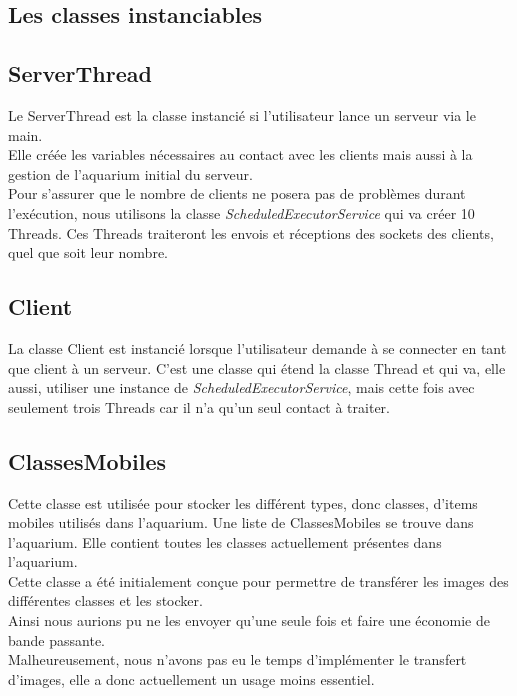 \documentclass[a4paper, 12pt]{report}
\begin{document}
\begin{spacing}{1.3}
	\textcolor{colortitre2}{\subsection*{Les classes instanciables}}  	

		\textcolor{colortitre3}{\subsection*{ServerThread}}    

	Le ServerThread est la classe instancié si l'utilisateur lance un serveur via le main. \\
	Elle créée les variables nécessaires au contact avec les clients mais aussi à la gestion de l'aquarium initial du serveur. \\
	Pour s'assurer que le nombre de clients ne posera pas de problèmes durant l'exécution, nous utilisons la classe \textit{ScheduledExecutorService} qui va créer 10 Threads. Ces Threads traiteront les envois et réceptions des sockets des clients, quel que soit leur nombre. \\
	
		\textcolor{colortitre3}{\subsection*{Client}}    
	La classe Client est instancié lorsque l'utilisateur demande à se connecter en tant que client à un serveur. C'est une classe qui étend la classe Thread et qui va, elle aussi, utiliser une instance de \textit{ScheduledExecutorService}, mais cette fois avec seulement trois Threads car il n'a qu'un seul contact à traiter.
		
		\textcolor{colortitre3}{\subsection*{ClassesMobiles}}    
		
	Cette classe est utilisée pour stocker les différent types, donc classes, d'items mobiles utilisés dans l'aquarium. Une liste de ClassesMobiles se trouve dans l'aquarium. Elle contient toutes les classes actuellement présentes dans l'aquarium. \\ Cette classe a été initialement conçue pour permettre de transférer les images des différentes classes et les stocker.\\ Ainsi nous aurions pu ne les envoyer qu'une seule fois et faire une économie de bande passante.\\ Malheureusement, nous n'avons pas eu le temps d'implémenter le transfert d'images, elle a donc actuellement un usage moins essentiel.
		

\end{spacing}
\end{document}
